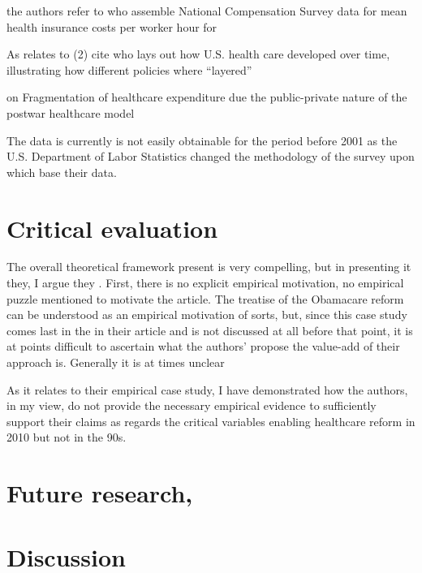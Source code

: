 \documentclass[11pt]{article}
\begin{document}

the authors refer to \textcite[][]{Claxton2011} who assemble National Compensation Survey data for mean health insurance costs per worker hour for

\begin{figure}[H]
  \sffamily
  
  \label{fig:ecec}
\end{figure}

As relates to (2)\textcite[][]{Jacobs2014} cite \textcite[][]{Hacker1998} who lays out how U.S. health care developed over time, illustrating how different policies where \enquote{layered}

on Fragmentation of healthcare expenditure due the public-private nature of the postwar healthcare model

The data is currently is not easily obtainable for the period before 2001 as the U.S. Department of Labor Statistics changed the methodology of the survey upon which \textcite[][]{Claxton2011} base their data.

\section*{Critical evaluation}

The overall theoretical framework \textcite[][]{Jacobs2014} present is very compelling, but in presenting it they, I argue they  . First, there is no explicit empirical motivation, no empirical puzzle mentioned to motivate the article. The treatise of the Obamacare reform can be understood as an empirical motivation of sorts, but, since this case study comes last in the in their article and is not discussed at all before that point, it is at points difficult to ascertain what the authors' propose the value-add of their approach is. Generally it is at times unclear

As it relates to their empirical case study, I have demonstrated how the authors, in my view, do not provide the necessary empirical evidence to sufficiently support their claims as regards the critical variables enabling healthcare reform in 2010 but not in the 90s.

\section*{Future research, }

\section*{Discussion}

\newpage
\newpage
\thispagestyle{empty}
\begingroup
{}
\printbibliography
\endgroup
\end{document}
